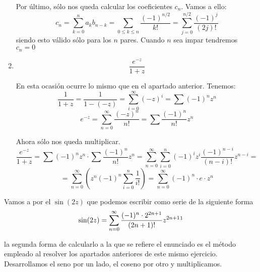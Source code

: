 \begin{problem}[5]
\begin{enumerate}
Por último, sólo nos queda calcular los coeficientes $c_n$. Vamos a ello:
\[c_n = \sum_{k=0}^n a_kb_{n-k} = \sum_{0\leq k \leq n} \frac{(-1)^{n/2}}{k!} = \sum_{j=0}^{n/2} \frac{(-1)^{j}}{(2j)!}\]
siendo esto válido sólo para los $n$ pares. Cuando $n$ sea impar tendremos $c_n=0$


\item
\[\frac{e^{-z}}{1+z}\]


En esta ocasión ocurre lo mismo que en el apartado anterior. Tenemos:
\[\frac{1}{1+z}=\frac{1}{1-(-z)} = \sum_{i=0}^{\infty}(-z)^i=\sum (-1)^nz^n\]
\[e^{-z} = \sum_{n=0}^{\infty}\frac{(-z)^n}{n!} = \sum \frac{(-1)^n}{n!}z^n\]

Ahora sólo nos queda multiplicar.
\[\frac{e^{-z}}{1+z}=\sum (-1)^nz^n \cdot \sum \frac{(-1)^n}{n!}z^n = \sum_{n=0}^{\infty}\sum_{i=0}^n(-1)^iz^i\frac{(-1)^{n-i}}{(n-i)!}z^{n-i} = \]
\[=\sum_{n=0}^{\infty}\left(z^n (-1)^n\sum_{i=0}^n\frac{1}{i!} \right)= \sum_{n=0}^{\infty}(-1)^n\cdot e \cdot z^n\]

\end{enumerate}

Vamos a por el $\sin(2z)$ que podemos escribir como serie de la siguiente forma
\[\sin(2z) =\sum_{n=0}^{\infty} \frac{(-1)^n\cdot 2^{2n+1}}{(2n+1)!}z^{2n+1}\footnote{Esta fórmula la plantó la profesora en clase. Puede obtenerse aplicando Taylor o mediante ideas felices que permitan asemejar la función objeto de estudio a otra ya estudiada}\]

la segunda forma de calcularlo a la que se refiere el enunciado es el método empleado al resolver los apartados anteriores de este mismo ejercicio. Desarrollamos el seno por un lado, el coseno por otro y multiplicamos.

\end{problem}

